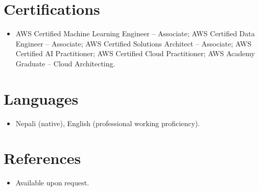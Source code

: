 \documentclass[11pt,a4paper,sans]{moderncv}
\begin{document}

\section{Certifications}
\vspace{1pt}
\begin{itemize}
\item {AWS Certified Machine Learning Engineer -- Associate; AWS Certified Data Engineer -- Associate; AWS Certified Solutions Architect -- Associate; AWS Certified AI Practitioner; AWS Certified Cloud Practitioner; AWS Academy Graduate -- Cloud Architecting.}
\end{itemize}


\section{Languages}
\vspace{1pt}
\begin{itemize}
\item {Nepali (native), English (professional working proficiency).}
\end{itemize}


\section{References}
\vspace{1pt}
\begin{itemize}
\item{Available upon request.}
\end{itemize}
\end{document}
